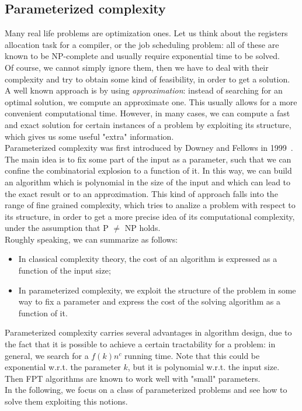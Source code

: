\documentclass{article}
\theoremstyle{definition}
\theoremstyle{lemma}
\theoremstyle{corollary}
\theoremstyle{theorem}
\begin{document}
\subsection{Parameterized complexity}
Many real life problems are optimization ones. Let us think about the registers
allocation task for a compiler, or the job scheduling problem: all of these are known
to be NP-complete and usually require exponential time to be solved. \\
Of course, we cannot simply ignore them, then we have to deal with their complexity and try to obtain some kind of feasibility, in order to get a solution. \\
A well known approach is by using \emph{approximation}: instead of searching for an optimal solution, we compute an approximate one. This usually allows for a more convenient computational time. However, in many cases, we can compute a fast and exact solution for certain instances of a problem by exploiting its structure, which gives us some useful "extra" information. \\
Parameterized complexity was first introduced by Downey and Fellows in 1999~\cite{downey}. The main idea is to fix some part of the input as a parameter, such that we can confine the combinatorial explosion to a function of it. In this way, we can build an algorithm which is polynomial in the size of the input and which can lead to the exact result or to an approximation. This kind of approach falls into the range of fine grained complexity, which tries to analize a problem with respect to its structure, in order to get a more precise idea of its computational complexity, under the assumption that P $\not =$ NP holds. \\
Roughly speaking, we can summarize as follows:
\begin{itemize}
	\item In classical complexity theory, the cost of an algorithm is expressed as a 
	function of the input size;
	\item In parameterized complexity, we exploit the structure of the problem in some way to
	fix a parameter and express the cost of the solving algorithm as a function of it.
\end{itemize}
Parameterized complexity carries several advantages in algorithm design, due to the fact that it is possible to achieve a certain tractability for a problem: in general, we search for a $f(k)n^
c$ running time. Note that this could be exponential w.r.t. the parameter $k$, but it is polynomial w.r.t. the input size. Then FPT algorithms are known to work well with "small" parameters. \\
In the following, we focus on a class of parameterized problems and see how to solve them exploiting this notions.
\end{document}
